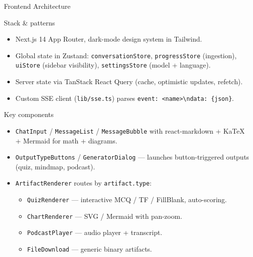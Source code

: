 \documentclass[aspectratio=169, 10pt]{beamer}
\begin{document}
\begin{frame}{Frontend Architecture}
  \scriptsize
  \begin{block}{Stack \& patterns}
    \begin{itemize}
      \setlength\itemsep{0pt}
      \item Next.js 14 App Router, dark-mode design system in Tailwind.
      \item Global state in Zustand: \texttt{conversationStore},
            \texttt{progressStore} (ingestion), \texttt{uiStore} (sidebar
            visibility), \texttt{settingsStore} (model + language).
      \item Server state via TanStack React Query (cache,
            optimistic updates, refetch).
      \item Custom SSE client (\texttt{lib/sse.ts}) parses
            \texttt{event: <name>\textbackslash ndata: \{json\}}.
    \end{itemize}
  \end{block}

  \begin{block}{Key components}
    \begin{itemize}
      \setlength\itemsep{0pt}
      \item \texttt{ChatInput} / \texttt{MessageList} / \texttt{MessageBubble}
            with react-markdown + KaTeX + Mermaid for math + diagrams.
      \item \texttt{OutputTypeButtons} / \texttt{GeneratorDialog} ---
            launches button-triggered outputs (quiz, mindmap, podcast).
      \item \texttt{ArtifactRenderer} routes by \texttt{artifact.type}:
            \begin{itemize}\setlength\itemsep{0pt}
              \item \texttt{QuizRenderer} --- interactive MCQ / TF / FillBlank,
                    auto-scoring.
              \item \texttt{ChartRenderer} --- SVG / Mermaid with pan-zoom.
              \item \texttt{PodcastPlayer} --- audio player + transcript.
              \item \texttt{FileDownload} --- generic binary artifacts.
            \end{itemize}
    \end{itemize}
  \end{block}
\end{frame}
\end{document}
